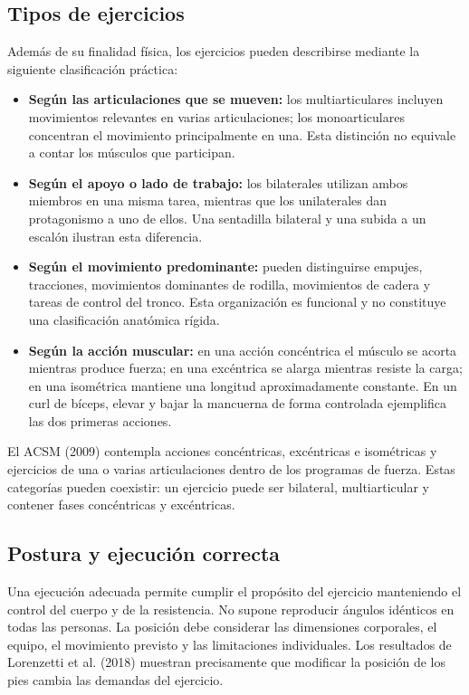\subsection{Tipos de ejercicios}

Además de su finalidad física, los ejercicios pueden describirse mediante la siguiente clasificación práctica:

\begin{itemize}
    \item \textbf{Según las articulaciones que se mueven:} los multiarticulares incluyen movimientos relevantes en varias articulaciones; los monoarticulares concentran el movimiento principalmente en una. Esta distinción no equivale a contar los músculos que participan.
    \item \textbf{Según el apoyo o lado de trabajo:} los bilaterales utilizan ambos miembros en una misma tarea, mientras que los unilaterales dan protagonismo a uno de ellos. Una sentadilla bilateral y una subida a un escalón ilustran esta diferencia.
    \item \textbf{Según el movimiento predominante:} pueden distinguirse empujes, tracciones, movimientos dominantes de rodilla, movimientos de cadera y tareas de control del tronco. Esta organización es funcional y no constituye una clasificación anatómica rígida.
    \item \textbf{Según la acción muscular:} en una acción concéntrica el músculo se acorta mientras produce fuerza; en una excéntrica se alarga mientras resiste la carga; en una isométrica mantiene una longitud aproximadamente constante. En un curl de bíceps, elevar y bajar la mancuerna de forma controlada ejemplifica las dos primeras acciones.
\end{itemize}

El ACSM (2009) contempla acciones concéntricas, excéntricas e isométricas y ejercicios de una o varias articulaciones dentro de los programas de fuerza. Estas categorías pueden coexistir: un ejercicio puede ser bilateral, multiarticular y contener fases concéntricas y excéntricas.

\subsection{Postura y ejecución correcta}

Una ejecución adecuada permite cumplir el propósito del ejercicio manteniendo el control del cuerpo y de la resistencia. No supone reproducir ángulos idénticos en todas las personas. La posición debe considerar las dimensiones corporales, el equipo, el movimiento previsto y las limitaciones individuales. Los resultados de Lorenzetti et al. (2018) muestran precisamente que modificar la posición de los pies cambia las demandas del ejercicio.

